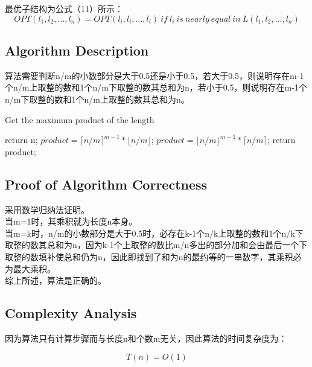 \documentclass{article}
\begin{document}
\begin{CJK*}{UTF8}{gbsn}
最优子结构为公式（11）所示：
\begin{equation}
OPT(l_1,l_2,...,l_n) = OPT(l_i,l_i,...,l_i)\ if\ l_i\ is\ nearly\ equal\ in\  L(l_1,l_2,...,l_n)
\end{equation} 


\subsection{Algorithm Description}
算法需要判断n/m的小数部分是大于0.5还是小于0.5，若大于0.5，则说明存在m-1个n/m上取整的数和1个n/m下取整的数其总和为n，若小于0.5，则说明存在m-1个n/m下取整的数和1个n/m上取整的数其总和为n。


\begin{algorithm}[htbp]  
  \caption{Get the maximum product of the length}  
  \begin{algorithmic}[1] 
	\State return n;
	\EndIf
	\State $product = {\lceil n/m\rceil}^{m-1}\ast \lfloor n/m\rfloor$;
	\Else
	\State $product = {\lfloor n/m\rfloor}^{m-1}\ast \lceil n/m\rceil$;
	\EndIf
	\State return product;
    \EndFunction 
  \end{algorithmic}  
\end{algorithm} 



\subsection{Proof of Algorithm Correctness}
采用数学归纳法证明。\\

当m=1时，其乘积就为长度n本身。\\

当m=k时，n/m的小数部分是大于0.5时，必存在k-1个n/k上取整的数和1个n/k下取整的数其总和为n，因为k-1个上取整的数比m/n多出的部分加和会由最后一个下取整的数填补使总和仍为n，因此即找到了和为n的最约等的一串数字，其乘积必为最大乘积。\\

综上所述，算法是正确的。

\subsection{Complexity Analysis}
因为算法只有计算步骤而与长度n和个数m无关，因此算法的时间复杂度为：

\begin{equation}
T(n) = O(1)
\end{equation} 


\end{CJK*}
\end{document}
